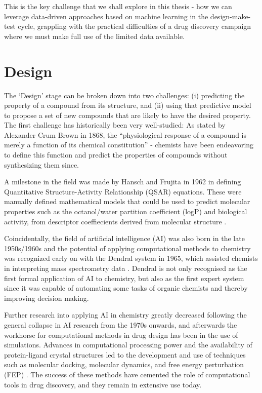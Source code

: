 This is the key challenge that we shall explore in this thesis - how we can leverage data-driven approaches based on machine learning in the design-make-test cycle, grappling with the practical difficulties of a drug discovery campaign where we must make full use of the limited data available.

\section*{Design}

The `Design' stage can be broken down into two challenges: (i) predicting the property of a compound from its structure, and (ii) using that predictive model to propose a set of new compounds that are likely to have the desired property. The first challenge has historically been very well-studied: As stated by Alexander Crum Brown in 1868, the ``physiological response of a compound is merely a function of its chemical constitution'' \cite{Brown1868} - chemists have been endeavoring to define this function and predict the properties of compounds without synthesizing them since.

A milestone in the field was made by Hansch and Frujita in 1962 in defining Quantitative Structure-Activity Relationship (QSAR) equations. These were manually defined mathematical models that could be used to predict molecular properties such as the octanol/water partition coefficient (logP) and biological activity, from descriptor coeffiecients derived from molecular structure \cite{hansch1962correlation, hansch1964p}.

Coincidentally, the field of artificial intelligence (AI) was also born in the late 1950s/1960s and the potential of applying computational methods to chemistry was recognized early on with the Dendral system in 1965, which assisted chemists in interpreting mass spectrometry data \cite{Lindsay1993Dendral}. Dendral is not only recognised as the first formal application of AI to chemistry, but also as the first expert system since it was capable of automating some tasks of organic chemists and thereby improving decision making.

Further research into applying AI in chemistry greatly decreased following the general collapse in AI research from the 1970s onwards, and afterwards the workhorse for computational methods in drug design has been in the use of simulations. Advances in computational processing power and the availability of protein-ligand crystal structures led to the development and use of techniques such as molecular docking, molecular dynamics, and free energy perturbation (FEP) \cite{Yu2017CADDMethods}. The success of these methods have cemented the role of computational tools in drug discovery, and they remain in extensive use today.

